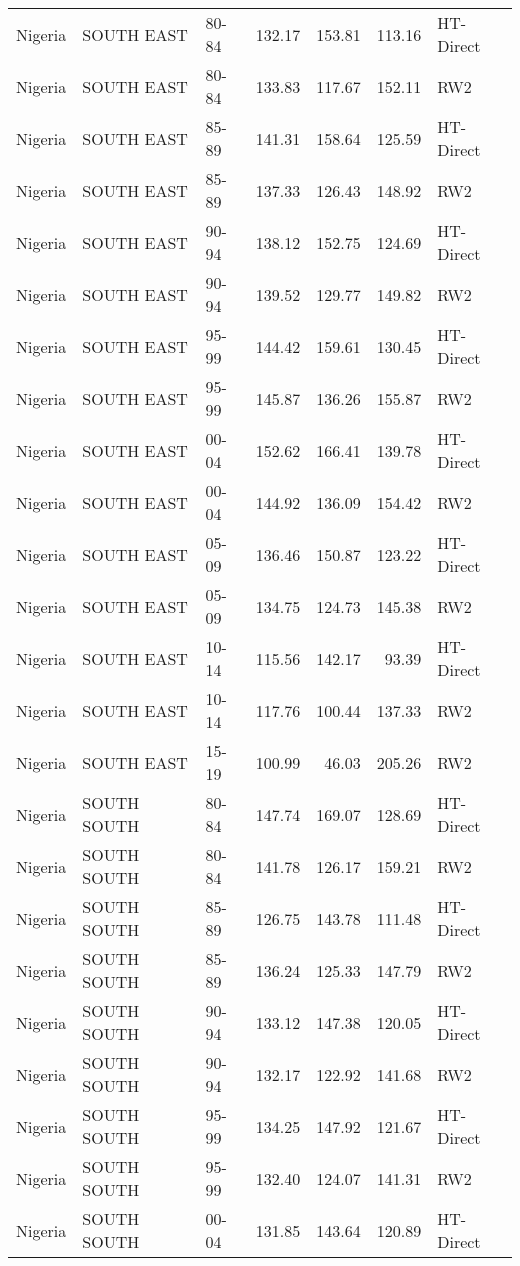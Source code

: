 \begin{longtable}{lllrrrl}
  Nigeria & SOUTH EAST & 80-84 & 132.17 & 153.81 & 113.16 & HT-Direct \\ 
  Nigeria & SOUTH EAST & 80-84 & 133.83 & 117.67 & 152.11 & RW2 \\ 
  Nigeria & SOUTH EAST & 85-89 & 141.31 & 158.64 & 125.59 & HT-Direct \\ 
  Nigeria & SOUTH EAST & 85-89 & 137.33 & 126.43 & 148.92 & RW2 \\ 
  Nigeria & SOUTH EAST & 90-94 & 138.12 & 152.75 & 124.69 & HT-Direct \\ 
  Nigeria & SOUTH EAST & 90-94 & 139.52 & 129.77 & 149.82 & RW2 \\ 
  Nigeria & SOUTH EAST & 95-99 & 144.42 & 159.61 & 130.45 & HT-Direct \\ 
  Nigeria & SOUTH EAST & 95-99 & 145.87 & 136.26 & 155.87 & RW2 \\ 
  Nigeria & SOUTH EAST & 00-04 & 152.62 & 166.41 & 139.78 & HT-Direct \\ 
  Nigeria & SOUTH EAST & 00-04 & 144.92 & 136.09 & 154.42 & RW2 \\ 
  Nigeria & SOUTH EAST & 05-09 & 136.46 & 150.87 & 123.22 & HT-Direct \\ 
  Nigeria & SOUTH EAST & 05-09 & 134.75 & 124.73 & 145.38 & RW2 \\ 
  Nigeria & SOUTH EAST & 10-14 & 115.56 & 142.17 & 93.39 & HT-Direct \\ 
  Nigeria & SOUTH EAST & 10-14 & 117.76 & 100.44 & 137.33 & RW2 \\ 
  Nigeria & SOUTH EAST & 15-19 & 100.99 & 46.03 & 205.26 & RW2 \\ 
  Nigeria & SOUTH SOUTH & 80-84 & 147.74 & 169.07 & 128.69 & HT-Direct \\ 
  Nigeria & SOUTH SOUTH & 80-84 & 141.78 & 126.17 & 159.21 & RW2 \\ 
  Nigeria & SOUTH SOUTH & 85-89 & 126.75 & 143.78 & 111.48 & HT-Direct \\ 
  Nigeria & SOUTH SOUTH & 85-89 & 136.24 & 125.33 & 147.79 & RW2 \\ 
  Nigeria & SOUTH SOUTH & 90-94 & 133.12 & 147.38 & 120.05 & HT-Direct \\ 
  Nigeria & SOUTH SOUTH & 90-94 & 132.17 & 122.92 & 141.68 & RW2 \\ 
  Nigeria & SOUTH SOUTH & 95-99 & 134.25 & 147.92 & 121.67 & HT-Direct \\ 
  Nigeria & SOUTH SOUTH & 95-99 & 132.40 & 124.07 & 141.31 & RW2 \\ 
  Nigeria & SOUTH SOUTH & 00-04 & 131.85 & 143.64 & 120.89 & HT-Direct \\ 

\end{longtable}
